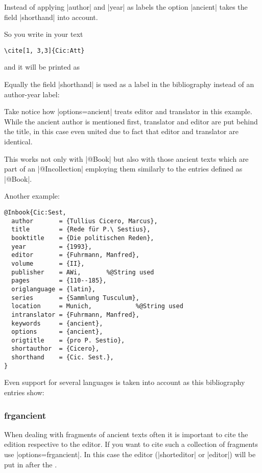 \documentclass[a4paper,
10pt,
greek,
french,
spanish,
italian,
ngerman,
english
]{ltxdoc}
\begin{document}
Instead of applying |author| and |year| as labels the option |ancient| takes the field |shorthand| into account.

So you write in your text
\begin{lstlisting}
\cite[1, 3,3]{Cic:Att}\end{lstlisting} 

and it will be printed as

\begin{refsection}
\begin{bsp}
\cite[1, 3,3]{Cic:Att}
\end{bsp}\end{refsection}

Equally the field |shorthand| is used as a label in the bibliography instead of an author-year label:

Take notice how |options={ancient}| treats editor and translator in this example. 
While the ancient author is mentioned first, translator and editor are put behind the title, 
in this case even united due to fact that editor and translator are identical.

This works not only with |@Book| but also with those ancient texts which are part of an |@Incollection| employing them similarly to the entries defined as |@Book|.

Another example:
\begin{lstlisting}[style=bibentry,label=Cic:Sest,caption={{@}Inbook\{Cic:Sest,…\} }]
@Inbook{Cic:Sest,
  author       = {Tullius Cicero, Marcus},
  title        = {Rede für P.\ Sestius},
  booktitle    = {Die politischen Reden},
  year         = {1993},
  editor       = {Fuhrmann, Manfred},
  volume       = {II},
  publisher    = AWi,		%@String used
  pages        = {110--185},
  origlanguage = {latin},
  series       = {Sammlung Tusculum},
  location     = Munich,			%@String used
  intranslator = {Fuhrmann, Manfred},
  keywords     = {ancient},
  options      = {ancient},
  origtitle    = {pro P. Sestio},
  shortauthor  = {Cicero},
  shorthand    = {Cic. Sest.},
}
\end{lstlisting}

Even support for several languages is taken into account as this bibliography entries show: 

\subsubsection{frgancient}\label{frgancient}
When dealing with fragments of ancient texts often it is important to cite the edition respective to the editor.
If you want to cite such a collection of fragments use |options={frgancient}|.
In this case the editor (|shorteditor| or |editor|) will be put in after the . 
\end{document}
